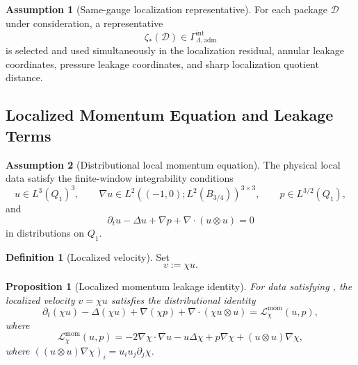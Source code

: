 \documentclass[11pt]{article}
\numberwithin{equation}{section}
\newtheorem{proposition}[proposition]{Proposition}
\theoremstyle{definition}
\newtheorem{definition}[definition]{Definition}
\newtheorem{assumption}[assumption]{Assumption}
\theoremstyle{remark}
\newcommand{\adm}{\mathrm{adm}}
\newcommand{\mom}{\mathrm{mom}}
\newcommand{\calD}{\mathcal D}
\newcommand{\Qone}{Q_1}
\newcommand{\Gadm}{\Gamma^{\mathrm{int}}_{\Lambda,\adm}}
\begin{document}
\begin{assumption}[Same-gauge localization representative]
\label{loc:ass:same-gauge-loc}
For each package \(\calD\) under consideration, a representative
\[
    \zeta_*(\calD)\in\Gadm
\]
is selected and used simultaneously in the localization residual, annular
leakage coordinates, pressure leakage coordinates, and sharp localization
quotient distance.
\end{assumption}

\subsection{Localized Momentum Equation and Leakage Terms}
\label{loc:sec:momentum-identity}

\begin{assumption}[Distributional local momentum equation]
\label{loc:ass:distributional-momentum}
The physical local data satisfy the finite-window integrability conditions
\[
    u\in L^3(\Qone)^3,
    \qquad
    \nabla u\in L^2((-1,0);L^2(B_{3/4}))^{3\times3},
    \qquad
    p\in L^{3/2}(\Qone),
\]
and
\[
    \partial_tu-\Delta u+\nabla p+\nabla\cdot(u\otimes u)=0
\]
in distributions on \(\Qone\).
\end{assumption}

\begin{definition}[Localized velocity]
\label{loc:def:localized-velocity}
Set
\[
    v:=\chi u.
\]
\end{definition}

\begin{proposition}[Localized momentum leakage identity]
\label{loc:prop:localized-momentum-identity}
For data satisfying , the localized velocity
\(v=\chi u\) satisfies the distributional identity
\[
    \partial_t(\chi u)
    -\Delta(\chi u)
    +\nabla(\chi p)
    +\nabla\cdot(\chi u\otimes u)
    =
    \mathcal L_\chi^{\mom}(u,p),
\]
where
\[
    \mathcal L_\chi^{\mom}(u,p)
    =
    -2\nabla\chi\cdot\nabla u
    -
    u\Delta\chi
    +
    p\nabla\chi
    +
    (u\otimes u)\nabla\chi,
\]
where \(((u\otimes u)\nabla\chi)_i=u_i u_j\partial_j\chi\).
\end{proposition}
\end{document}
